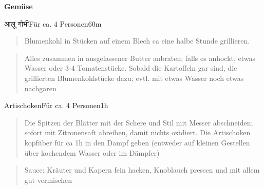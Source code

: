 \documentclass[
  a4paper,
]{article}
\begin{document}
\newpage
\vspace*{\fill}

\textbf{\Huge \sf Gemüse} \vspace*{\fill} \thispagestyle{empty} \newpage

\begin{recipe}{\Dev आलू गोभी}{Für ca. 4 Personen}{60m}


\begin{quote}
Blumenkohl in Stücken auf einem Blech ca eine halbe Stunde grillieren.
\end{quote}

\freeform\hrulefill


\begin{quote}
Alles zusammen in ausgelassener Butter anbraten; falls es anhockt, etwas
Wasser oder 3-4 Tomatenstücke. Sobald die Kartoffeln gar sind, die
grillierten Blumenkohlstücke dazu; evtl. mit etwas Wasser noch etwas
nachgaren
\end{quote}

\freeform\hrulefill\newline\freeform{}\end{recipe}

\newpage

\begin{recipe}{Artischoken}{Für ca. 4 Personen}{1h}


\begin{quote}
Die Spitzen der Blätter mit der Schere und Stil mit Messer abschneiden;
sofort mit Zitronensaft abreiben, damit nichts oxidiert. Die Artischoken
kopfüber für ca 1h in den Dampf geben (entweder auf kleinen Gestellen
über kochendem Wasser oder im Dämpfer)
\end{quote}

\freeform\hrulefill


\begin{quote}
Sauce: Kräuter und Kapern fein hacken, Knoblauch pressen und mit allem
gut vermischen
\end{quote}

\freeform\hrulefill\newline\freeform{}\end{recipe}
\end{document}
